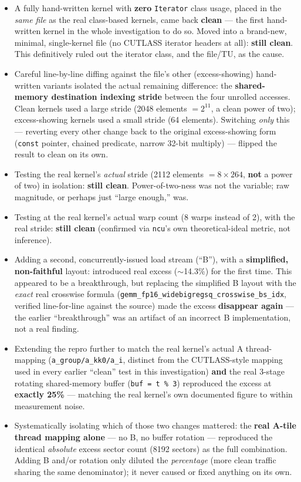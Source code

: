 \documentclass[11pt]{article}
\begin{document}
\begin{itemize}
\item A fully hand-written kernel with \textbf{zero} \texttt{Iterator} class usage, placed in the \emph{same file} as the real class-based kernels, came back \textbf{clean} --- the first hand-written kernel in the whole investigation to do so. Moved into a brand-new, minimal, single-kernel file (no CUTLASS iterator headers at all): \textbf{still clean}. This definitively ruled out the iterator class, and the file/TU, as the cause.
\item Careful line-by-line diffing against the file's other (excess-showing) hand-written variants isolated the actual remaining difference: the \textbf{shared-memory destination indexing stride} between the four unrolled accesses. Clean kernels used a large stride (2048 elements $= 2^{11}$, a clean power of two); excess-showing kernels used a small stride (64 elements). Switching \emph{only} this --- reverting every other change back to the original excess-showing form (\texttt{const} pointer, chained predicate, narrow 32-bit multiply) --- flipped the result to clean on its own.
\item Testing the real kernel's \emph{actual} stride (2112 elements $= 8\times264$, \textbf{not} a power of two) in isolation: \textbf{still clean}. Power-of-two-ness was not the variable; raw magnitude, or perhaps just ``large enough,'' was.
\item Testing at the real kernel's actual warp count (8 warps instead of 2), with the real stride: \textbf{still clean} (confirmed via \texttt{ncu}'s own theoretical-ideal metric, not inference).
\item Adding a second, concurrently-issued load stream (``B''), with a \textbf{simplified, non-faithful} layout: introduced real excess ($\sim$14.3\%) for the first time. This appeared to be a breakthrough, but replacing the simplified B layout with the \emph{exact} real crosswise formula (\texttt{gemm\_fp16\_widebigregsq\_crosswise\_bs\_idx}, verified line-for-line against the source) made the excess \textbf{disappear again} --- the earlier ``breakthrough'' was an artifact of an incorrect B implementation, not a real finding.
\item Extending the repro further to match the real kernel's actual A thread-mapping (\texttt{a\_group/a\_kk0/a\_i}, distinct from the CUTLASS-style mapping used in every earlier ``clean'' test in this investigation) \textbf{and} the real 3-stage rotating shared-memory buffer (\texttt{buf = t \% 3}) reproduced the excess at \textbf{exactly 25\%} --- matching the real kernel's own documented figure to within measurement noise.
\item Systematically isolating which of those two changes mattered: the \textbf{real A-tile thread mapping alone} --- no B, no buffer rotation --- reproduced the identical \emph{absolute} excess sector count (8192 sectors) as the full combination. Adding B and/or rotation only diluted the \emph{percentage} (more clean traffic sharing the same denominator); it never caused or fixed anything on its own.
\end{itemize}
\end{document}
